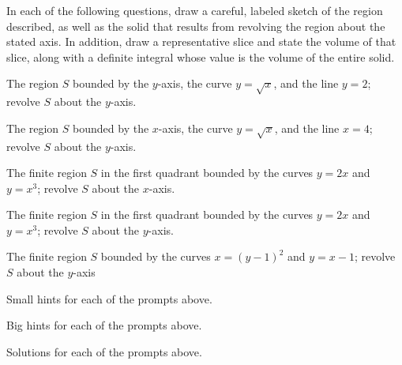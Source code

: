 \begin{activity} \label{A:6.1.2}  
In each of the following questions, draw a careful, labeled sketch of the region described, as well as the solid that results from revolving the region about the stated axis.  In addition, draw a representative slice and state the volume of that slice, along with a definite integral whose value is the volume of the entire solid.  %
\ba
\item The region $S$ bounded by the $y$-axis, the curve $y = \sqrt{x}$, and the line $y = 2$; revolve $S$ about the $y$-axis.
\item The region $S$ bounded by the $x$-axis, the curve $y = \sqrt{x}$, and the line $x = 4$; revolve $S$ about the $y$-axis.
\item The finite region $S$ in the first quadrant bounded by the curves $y = 2x$ and $y = x^3$; revolve $S$ about the $x$-axis.	
\item The finite region $S$ in the first quadrant bounded by the curves $y = 2x$ and $y = x^3$; revolve $S$ about the $y$-axis.
\item The finite region $S$ bounded by the curves $x = (y-1)^2$ and $y  = x-1$; revolve $S$ about the $y$-axis
\ea

\end{activity}
\begin{smallhint}
\ba
	\item Small hints for each of the prompts above.
\ea
\end{smallhint}
\begin{bighint}
\ba
	\item Big hints for each of the prompts above.
\ea
\end{bighint}
\begin{activitySolution}
\ba
	\item Solutions for each of the prompts above.
\ea
\end{activitySolution}
\aftera
